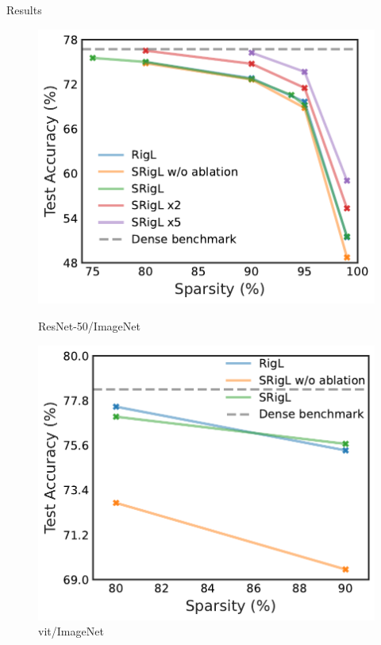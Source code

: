 \documentclass[final]{beamer}
\newlength{\colwidth}
\begin{document}
\begin{frame}[t]
\begin{columns}[t]
\begin{column}{\colwidth}
\begin{block}{Results}
\begin{figure}
    \begin{minipage}{.49\colwidth}
        \centering
        \includegraphics[width=0.49\colwidth]{srigl_example_figs/resnet50.pdf}
        \caption{ResNet-50/ImageNet}\label{fig:resnet50_acc_vs_sparsity}
    \end{minipage}
    \hfill
    \begin{minipage}{.49\colwidth}
        \centering
        \includegraphics[width=0.49\colwidth]{srigl_example_figs/vit.pdf}
        \caption{\gls{vit}/ImageNet}\label{fig:vit}
    \end{minipage}
\end{figure}


\end{block}
\end{column}
\end{columns}
\end{frame}
\end{document}
